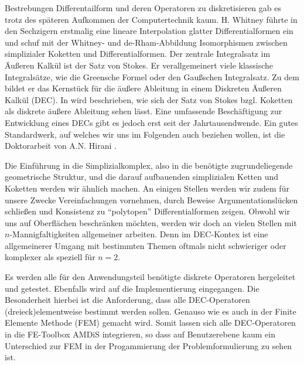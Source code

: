 Bestrebungen Differentailform und deren Operatoren zu diskretisieren gab es trotz des späteren Aufkommen der Computertechnik kaum.
H. Whitney \cite{whitney} führte in den Sechzigern erstmalig eine lineare Interpolation glatter Differentialformen ein 
und schuf mit der Whitney- und de-Rham-Abbildung Isomorphismen zwischen simplizialer Koketten und Differentialformen.
Der zentrale Integralsatz im Äußeren Kalkül ist der Satz von Stokes.
Er verallgemeinert viele klassische Integralsätze, wie die Greensche Formel oder den Gaußschen Integralsatz.
Zu dem bildet er das Kernstück für die äußere Ableitung in einem Diskreten Äußeren Kalkül (DEC).
In \cite[7.2C]{Marsden} wird beschrieben, wie sich der Satz von Stokes bzgl. Koketten als diskrete äußere Ableitung sehen lässt.
Eine umfassende Beschäftigung zur Entwicklung eines DECs gibt es jedoch erst seit der Jahrtausendwende.
Ein gutes Standardwerk, auf welches wir uns im Folgenden auch beziehen wollen, ist die Doktorarbeit von A.N. Hirani \cite{hirani}.

Die Einführung in die Simplizialkomplex, also in die benötigte zugrundeliegende geometrische Struktur, und die darauf aufbauenden simplizialen Ketten und Koketten werden wir ähnlich machen.
An einigen Stellen werden wir zudem für unsere Zwecke Vereinfachungen vornehmen, durch Beweise Argumentationslücken schließen und Konsistenz zu "`polytopen"' Differentialformen zeigen.
Obwohl wir uns auf Oberflächen beschränken möchten, werden wir doch an vielen Stellen mit \( n \)-Mannigfaltigkeiten allgemeiner arbeiten.
Denn im DEC-Kontex ist eine allgemeinerer Umgang mit bestimmten Themen oftmals nicht schwieriger oder komplexer als speziell für \( n=2 \). 

Es werden alle für den Anwendungsteil benötigte diskrete Operatoren hergeleitet und getestet.
Ebenfalls wird auf die Implementierung eingegangen.
Die Besonderheit hierbei ist die Anforderung, dass alle DEC-Operatoren (dreieck)elementweise bestimmt werden sollen.
Genauso wie es auch in der Finite Elemente Methode (FEM) gemacht wird. 
Somit lassen sich alle DEC-Operatoren in die FE-Toolbox AMDiS integrieren, so dass auf Benutzerebene kaum ein Unterschied zur FEM in der Progammierung der Problemformulierung zu sehen ist.

